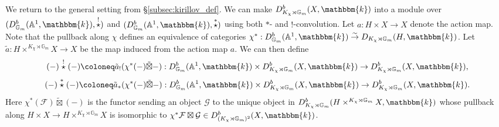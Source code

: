 \documentclass{amsart}
\newcommand{\A}{\mathbb{A}}
\newcommand{\G}{\mathbb{G}}
\renewcommand{\k}{\mathbbm{k}}
\newcommand{\scrF}{\mathcal{F}}
\newcommand{\scrG}{\mathcal{G}}
\newcommand{\sstar}{\stackrel{*}{\star}}
\newcommand{\cstar}{\stackrel{!}{\star}}
\theoremstyle{definition}
\begin{document}
    We return to the general setting from \S\ref{subsec:kirillov_def}.
    We can make $D_{K_{\chi} \rtimes \G_m}^b (X, \k)$ into a module over $(D_{\G_m}^b (\A^1, \k), \cstar)$ and $(D_{\G_m}^b (\A^1, \k), \sstar)$  using both $*$- and $!$-convolution.
    Let $a : H \times X \to X$ denote the action map.
    Note that the pullback along $\chi$ defines an equivalence of categories $\chi^* : D_{\G_m}^b (\A^1, \k) \stackrel{\sim}{\to} D_{K_{\chi} \rtimes \G_m} (H, \k)$.
    Let $\tilde{a} : H \times^{K_{\chi} \rtimes \G_m} X \to X$ be the map induced from the action map $a$.
    We can then define
    \[(-) \cstar (-) \coloneq \tilde{a}_! (\chi^* (-) \tilde{\boxtimes} -) : D_{\G_m}^b (\A^1, \k) \times D_{K_{\chi} \rtimes \G_m}^b (X, \k) \to D_{K_{\chi} \rtimes \G_m}^b (X, \k),\]
    \[(-) \sstar (-) \coloneq \tilde{a}_* (\chi^* (-) \tilde{\boxtimes} -) : D_{\G_m}^b (\A^1, \k) \times D_{K_{\chi} \rtimes \G_m}^b (X, \k) \to D_{K_{\chi} \rtimes \G_m}^b (X, \k).\]
    Here $\chi^* (\scrF) \tilde{\boxtimes} (-)$ is the functor sending an object $\scrG$ to the unique object in $D_{K_{\chi} \rtimes \G_m}^b (H \times^{K_{\chi} \rtimes \G_m} X, \k)$ whose pullback along $H \times X \to H \times^{K_{\chi} \rtimes \G_m} X$ is isomorphic to $\chi^* \scrF \boxtimes \scrG \in D_{(K_{\chi} \rtimes \G_m)^2}^b (X, \k)$.
\end{document}
